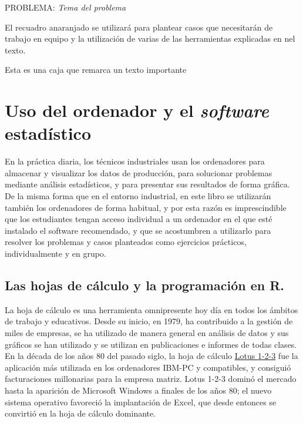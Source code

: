 \documentclass[
  letterpaper,
]{scrbook}
\begin{document}
\begin{cajanaranja}{ PROBLEMA: \emph{Tema del problema}}

El recuadro anaranjado se utilizará para plantear casos que necesitarán de trabajo en equipo y la utilización de varias de las herramientas explicadas en nel texto.

\end{cajanaranja}

\begin{tcolorbox}

Esta es una caja que remarca un texto importante

\end{tcolorbox}

\hypertarget{uso-del-ordenador-y-el-software-estaduxedstico}{%
\section*{\texorpdfstring{Uso del ordenador y el \emph{software}
estadístico}{Uso del ordenador y el software estadístico}}\label{uso-del-ordenador-y-el-software-estaduxedstico}}

En la práctica diaria, los técnicos industriales usan los ordenadores
para almacenar y visualizar los datos de producción, para solucionar
problemas mediante análisis estadísticos, y para presentar sus
resultados de forma gráfica. De la misma forma que en el entorno
industrial, en este libro se utilizarán también los ordenadores de forma
habitual, y por esta razón es imprescindible que los estudiantes tengan
acceso individual a un ordenador en el que esté instalado el software
recomendado, y que se acostumbren a utilizarlo para resolver los
problemas y casos planteados como ejercicios prácticos, individualmente
y en grupo.

\hypertarget{las-hojas-de-cuxe1lculo-y-la-programaciuxf3n-en-r.}{%
\subsection*{Las hojas de cálculo y la programación en
R.}\label{las-hojas-de-cuxe1lculo-y-la-programaciuxf3n-en-r.}}

La hoja de cálculo es una herramienta omnipresente hoy día en todos los
ámbitos de trabajo y educativos. Desde su inicio, en 1979, ha
contribuido a la gestión de miles de empresas, se ha utilizado de manera
general en análisis de datos y sus gráficos se han utilizado y se
utilizan en publicaciones e informes de todas clases. En la década de
los años 80 del pasado siglo, la hoja de cálculo
\href{https://es.wikipedia.org/wiki/Lotus_1-2-3}{Lotus 1-2-3} fue la
aplicación más utilizada en los ordenadores IBM-PC y compatibles, y
consiguió facturaciones millonarias para la empresa matriz. Lotus 1-2-3
dominó el mercado hasta la aparición de Microsoft Windows a finales de
los años 80; el nuevo sistema operativo favoreció la implantación de
Excel, que desde entonces se convirtió en la hoja de cálculo dominante.
\end{document}
